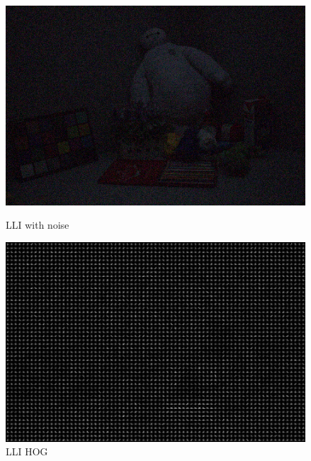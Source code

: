 \documentclass[CJK,aspectratio=169]{beamer}  %
\begin{document}
	\begin{frame}
		\begin{figure}
			\centering
			\setlength{\abovecaptionskip}{-0.005cm} 	
			\begin{minipage}{.3\textwidth}
				\centering
				\includegraphics[width=\linewidth]{picture/LLIE/My Architecture/Edge Detection/low00269}
				\caption*{\small LLI with noise}
			\end{minipage}
			\begin{minipage}{.3\textwidth}
				\centering
				\includegraphics[width=\linewidth]{picture/LLIE/My Architecture/Edge Detection/low00269_hog}	
				\caption*{\small LLI HOG}
			\end{minipage}
			\begin{minipage}{.3\textwidth}
				\centering

\end{minipage}
\end{figure}
\end{frame}
\end{document}
